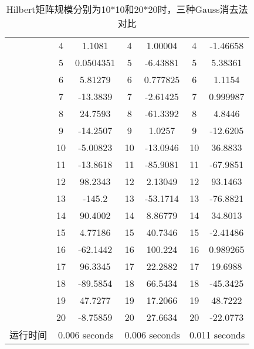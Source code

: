 \documentclass{article}
\begin{document}
\begin{table}[H]
\begin{tabular}{ccccccc}
		& 4            & 1.1081             & 4            & 1.00004            & 4            & -1.46658           \\
		& 5            & 0.0504351          & 5            & -6.43881           & 5            & 5.38361            \\
		& 6            & 5.81279            & 6            & 0.777825           & 6            & 1.1154             \\
		& 7            & -13.3839           & 7            & -2.61425           & 7            & 0.999987           \\
		& 8            & 24.7593            & 8            & -61.3392           & 8            & 4.8446             \\
		& 9            & -14.2507           & 9            & 1.0257             & 9            & -12.6205           \\
		& 10           & -5.00823           & 10           & -13.0946           & 10           & 36.8833            \\
		& 11           & -13.8618           & 11           & -85.9081           & 11           & -67.9851           \\
		& 12           & 98.2343            & 12           & 2.13049            & 12           & 93.1463            \\
		& 13           & -145.2             & 13           & -53.1714           & 13           & -76.8821           \\
		& 14           & 90.4002            & 14           & 8.86779            & 14           & 34.8013            \\
		& 15           & 4.77186            & 15           & 40.7346            & 15           & -2.41486           \\
		& 16           & -62.1442           & 16           & 100.224            & 16           & 0.989265           \\
		& 17           & 96.3345            & 17           & 22.2882            & 17           & 19.6988            \\
		& 18           & -89.5854           & 18           & 66.5434            & 18           & -45.3425           \\
		& 19           & 47.7277            & 19           & 17.2066            & 19           & 48.7222            \\
		& 20           & -8.75859           & 20           & 27.6634            & 20           & -22.0773           \\
		运行时间 & \multicolumn{2}{c}{0.006 seconds} & \multicolumn{2}{c}{0.006 seconds} & \multicolumn{2}{c}{0.011 seconds}\\
		\bottomrule
	\end{tabular}
	\caption{Hilbert矩阵规模分别为10*10和20*20时，三种Gauss消去法对比}
	\label{tab:my-table}
\end{table}
\end{document}
